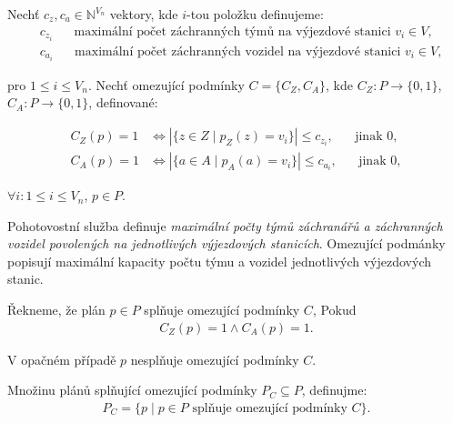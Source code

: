 \begin{definice}
  Nechť $c_z, c_a \in \mathbb{N}^{V_n}$ vektory, 
  kde $i$-tou položku definujeme:
  \begin{align*}
    &c_{z_{i}} \hspace{20pt} \text{maximální počet záchranných týmů na výjezdové stanici $v_i \in V$}, \\ 
    &c_{a_{i}} \hspace{20pt} \text{maximální počet záchranných vozidel na výjezdové stanici $v_i \in V$},
  \end{align*}

  pro $1 \leq i \leq V_n$.
  Nechť omezující podmínky $C = \{ C_Z, C_A \}$, kde $C_Z \colon P \rightarrow \{ 0, 1 \}$, $C_A \colon P \rightarrow \{ 0, 1 \}$, definované:

  \begin{align*}
    C_Z(p) = 1 &\iff |\{ z \in Z \mid p_Z(z) = v_i \}| \leq c_{z_{i}}, \hspace{20pt} \text{jinak 0}, \\
    C_A(p) = 1 &\iff |\{ a \in A \mid p_A(a) = v_i \}| \leq c_{a_{i}}, \hspace{20pt} \text{jinak 0},
  \end{align*}

  $\forall i \colon 1 \leq i \leq V_n$, $p \in P$.
\end{definice}

Pohotovostní služba definuje \textit{maximální počty týmů záchranářů a záchranných vozidel povolených na jednotlivých výjezdových stanicích}.
Omezující podmánky popisují maximální kapacity počtu týmu a vozidel jednotlivých výjezdových stanic.

\begin{definice}
  Řekneme, že plán $p \in P$ splňuje omezující podmínky $C$, Pokud
  \begin{align*}
    C_Z(p) = 1 \land C_A(p) = 1.
  \end{align*}

  V opačném případě $p$ nesplňuje omezující podmínky $C$.
\end{definice}

\begin{definice}
  Množinu plánů splňující omezující podmínky $P_C \subseteq P$, definujme:
  \begin{align*}
    P_C = \{ p \mid \text{$p \in P$ splňuje omezující podmínky $C$} \}.
  \end{align*}
\end{definice}

